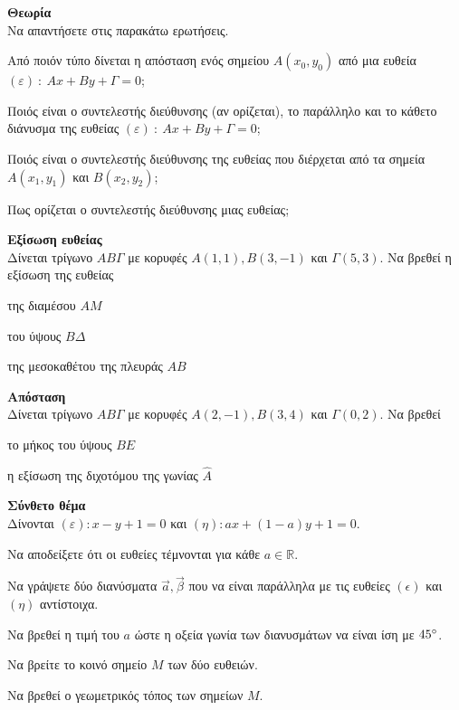 \documentclass[ektypwsh]{diag-xelatex}
\begin{document}
\begin{thema}
\item \textbf{Θεωρία}\\
Να απαντήσετε στις παρακάτω ερωτήσεις.
\begin{rlist}
\item Από ποιόν τύπο δίνεται η απόσταση ενός σημείου $ A(x_0,y_0) $ από μια ευθεία $(\varepsilon)\ :\  Ax+By+\varGamma=0 $;
\item Ποιός είναι ο συντελεστής διεύθυνσης (αν ορίζεται), το παράλληλο και το κάθετο διάνυσμα της ευθείας $(\varepsilon)\ :\  Ax+By+\varGamma=0 $;
\item Ποιός είναι ο συντελεστής διεύθυνσης της ευθείας που διέρχεται από τα σημεία $ A(x_1,y_1) $ και $ B(x_2,y_2) $;
\item Πως ορίζεται ο συντελεστής διεύθυνσης μιας ευθείας;
\end{rlist}
\item \textbf{Εξίσωση ευθείας}\\
Δίνεται τρίγωνο $ AB\varGamma $ με κορυφές $ A(1,1),B(3,-1) $ και $ \varGamma(5,3) $. Να βρεθεί η εξίσωση της ευθείας
\begin{rlist}
\item της διαμέσου $ AM $
\item του ύψους $ B\varDelta $
\item της μεσοκαθέτου της πλευράς $ AB $
\end{rlist}
\item \textbf{Απόσταση}\\
Δίνεται τρίγωνο $ AB\varGamma $ με κορυφές $ A(2,-1),B(3,4) $ και $ \varGamma(0,2) $. Να βρεθεί 
\begin{rlist}
\item το μήκος του ύψους $ BE $
\item η εξίσωση της διχοτόμου της γωνίας $ \hat{A} $
\end{rlist}
\item \textbf{Σύνθετο θέμα}\\
Δίνονται $ (\varepsilon): x-y+1=0 $ και $ (\eta): ax+(1-a)y+1=0 $.
\begin{rlist}
\item Να αποδείξετε ότι οι ευθείες τέμνονται για κάθε $ a\in\mathbb{R} $.
\item Να γράψετε δύο διανύσματα $ \vec{a},\vec{\beta} $ που να είναι παράλληλα με τις ευθείες $ (\epsilon) $ και $ (\eta) $ αντίστοιχα.\\
\item Να βρεθεί η τιμή του $ a $ ώστε η οξεία γωνία των διανυσμάτων να είναι ίση με $ 45\degree $.
\item Να βρείτε το κοινό σημείο $ M $ των δύο ευθειών.
\item Να βρεθεί ο γεωμετρικός τόπος των σημείων $ M $.
\end{rlist}
\end{thema}
\end{document}
